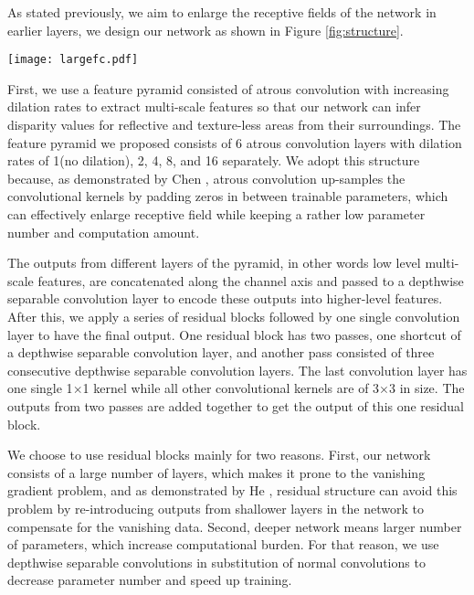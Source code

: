 \documentclass[10pt,twocolumn,letterpaper]{article}
\begin{document}
As stated previously, we aim to enlarge the receptive fields of the network in earlier layers, we design our network as shown in Figure \ref{fig:structure}.

\begin{figure*}
	\begin{center}
		\texttt{[image: largefc.pdf]}
	\end{center}
	\caption{The structure of our network.}
	\label{fig:structure}
\end{figure*}

First, we use a feature pyramid consisted of atrous convolution with increasing dilation rates to extract multi-scale features so that our network can infer disparity values for reflective and texture-less areas from their surroundings. The feature pyramid we proposed consists of 6 atrous convolution layers with dilation rates of 1(no dilation), 2, 4, 8, and 16 separately. We adopt this structure because, as demonstrated by Chen \etal\cite{chen2018deeplab}, atrous convolution up-samples the convolutional kernels by padding zeros in between trainable parameters, which can effectively enlarge receptive field while keeping a rather low parameter number and computation amount.

The outputs from different layers of the pyramid, in other words low level multi-scale features, are concatenated along the channel axis and passed to a depthwise separable convolution layer to encode these outputs into higher-level features. After this, we apply a series of residual blocks followed by one single convolution layer to have the final output. One residual block has two passes, one shortcut of a depthwise separable convolution layer, and another pass consisted of three consecutive depthwise separable convolution layers. The last convolution layer has one single 1$\times$1 kernel while all other convolutional kernels are of 3$\times$3 in size. The outputs from two passes are added together to get the output of this one residual block.

We choose to use residual blocks mainly for two reasons. First, our network consists of a large number of layers, which makes it prone to the vanishing gradient problem, and as demonstrated by He \etal\cite{he2016deep}, residual structure can avoid this problem by re-introducing outputs from shallower layers in the network to compensate for the vanishing data. Second, deeper network means larger number of parameters, which increase computational burden. For that reason, we use depthwise separable convolutions in substitution of normal convolutions to decrease parameter number and speed up training.
\end{document}

